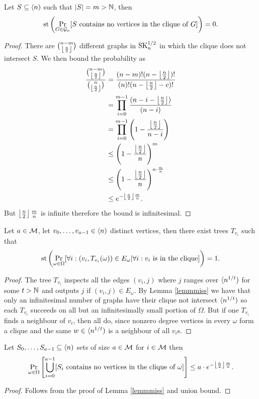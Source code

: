 \begin{lemm}\label{lemmmiss}
Let $S\subseteq \langle n)$ such that $\left|{S}\right|=m > \mathbb{N}$, then
\[\text{st}\left(\Pr_{G\in\mathcal{G}_n}[\text{$S$ contains no vertices in the clique of $G$}]\right)=0.\]
\end{lemm}
\begin{proof}
There are $\binom{n-m}{\left \lfloor {\frac{n}{2}} \right \rfloor}$ different graphs in $\text{SK}_n^{1/2}$ in which the clique does not intersect $S$. We then bound the probability as
\begin{align}
\frac{\binom{n-m}{\left \lfloor {\frac{n}{2}} \right \rfloor}}{\binom{n}{\left \lfloor {\frac{n}{2}} \right \rfloor}}&=\frac{(n-m)!(n-\left \lfloor {\frac{n}{2}} \right \rfloor)!}{(n)!(n-\left \lfloor {\frac{n}{2}} \right \rfloor-c)!}\\
&=\prod_{i=0}^{m-1}\frac{(n-i-\left \lfloor {\frac{n}{2}} \right \rfloor)}{(n-i)}\\
&=\prod_{i=0}^{m-1}\left(1-\frac{\left \lfloor {\frac{n}{2}} \right \rfloor}{n-i}\right)\\
&\leq \left(1-\frac{\left \lfloor {\frac{n}{2}} \right \rfloor}{n}\right)^m\\
&\leq \left(1-\frac{\left \lfloor {\frac{n}{2}} \right \rfloor}{n}\right)^{n \cdot \frac{m}{n}}\\
&\leq e^{-\left \lfloor {\frac{n}{2}} \right \rfloor\frac{m}{n}}.
\end{align}
But $\left \lfloor {\frac{n}{2}} \right \rfloor \frac{m}{n}$ is infinite therefore the bound is infinitesimal.
\end{proof}

\begin{lemm}\label{lemmfindtree}
Let $a\in\mathcal{M}$, let $v_0,\dots,v_{a-1}\in \langle n)$ distinct vertices, then there exist trees $T_{v_i}$ such that
\[\text{st}\left(\Pr_{\omega\in\Omega}[\forall i: (v_i,T_{v_i}(\omega))\in E_\omega|\forall i: \text{$v_i$ is in the clique}]\right)=1.\]
\end{lemm}

\begin{proof}
The tree $T_{v_i}$ inspects all the edges $(v_i,j)$ where $j$ ranges over $\langle n^{1/t})$ for some $t>\mathbb{N}$ and outputs $j$ if $(v_i,j)\in E_\omega$. By Lemma \ref{lemmmiss} we have that only an infinitesimal number of graphs have their clique not intersect $\langle n^{1/t})$ so each $T_{v_i}$ succeeds on all but an infinitesimally small portion of $\Omega$. But if one $T_{v_i}$ finds a neighbour of $v_i$, then all do, since nonzero degree vertices in every $\omega$ form a clique and the same $w\in\langle n^{1/t})$ is a neighbour of all $v_i$s.
\end{proof}

\begin{lemm}\label{lemmmiss2}
Let $S_0,\dots,S_{a-1}\subseteq\langle n)$ sets of size $a\in \mathcal{M}$ for $i\in \mathcal{M}$ then
\[\Pr_{\omega\in\Omega}\left[\bigcup_{i=0}^{a-1}[\text{$S_i$ contains no vertices in the clique of $\omega$}]\right]\leq a\cdot e^{-\left \lfloor {\frac{n}{2}} \right \rfloor\frac{m}{n}}.\]
\end{lemm}
\begin{proof}Follows from the proof of Lemma \ref{lemmmiss} and union bound.
\end{proof}


